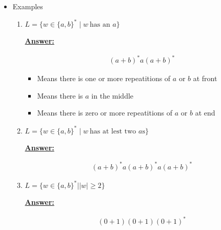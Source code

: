 \documentclass[12pt]{article}
\begin{document}
\begin{enumerate}[a.]
\begin{itemize}
        \item Examples
        \begin{enumerate}[1.]
            \item $L = \{w \in \{a,b\}^* \mid w\:\text{has an $a$} \}$

            \bigskip

            \begin{mdframed}
                \underline{\textbf{Answer:}}

                \begin{align}
                (a+b)^*a(a+b)^*
                \end{align}

                \bigskip

                \begin{itemize}
                    \item Means there is one or more repeatitions of $a$ or $b$ at front
                    \item Means there is $a$ in the middle
                    \item Means there is zero or more repeatitions of $a$ or $b$ at end
                \end{itemize}
            \end{mdframed}

            \item $L = \{w \in \{a,b\}^* \mid w\:\text{has at lest two $a$s}\}$

            \bigskip

            \begin{mdframed}
                \underline{\textbf{Answer:}}

                \begin{align}
                (a+b)^*a(a+b)^*a(a+b)^*
                \end{align}
            \end{mdframed}

            \item $L = \{w \in \{a,b\}^* \mid \vert w \vert \geq 2\}$

            \bigskip

            \begin{mdframed}
                \underline{\textbf{Answer:}}

                \begin{align}
                (0+1)(0+1)(0+1)^*
                \end{align}


\end{mdframed}
\end{enumerate}
\end{itemize}
\end{enumerate}
\end{document}
